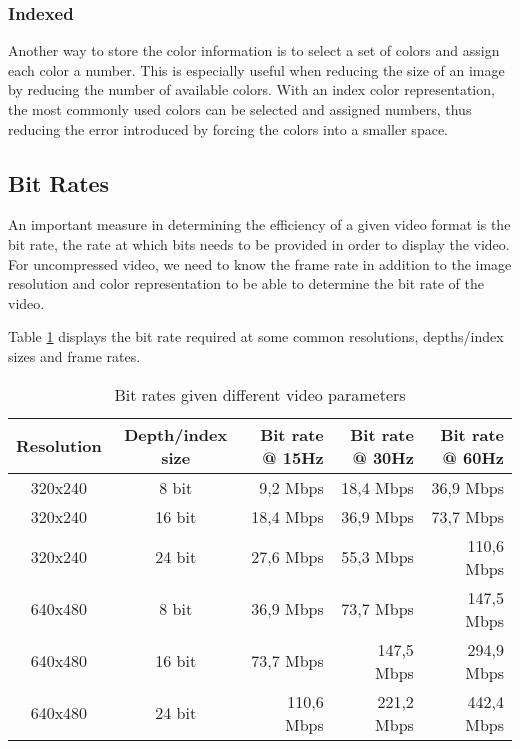 \subsubsection{Indexed}
Another way to store the color information is to select a set of colors and assign each color a number.
This is especially useful when reducing the size of an image by reducing the number of available colors.
With an index color representation, the most commonly used colors can be selected and assigned numbers, thus reducing the error introduced by forcing the colors into a smaller space.

\subsection{Bit Rates}
An important measure in determining the efficiency of a given video format is the bit rate, the rate at which bits needs to be provided in order to display the video.
For uncompressed video, we need to know the frame rate in addition to the image resolution and color representation to be able to determine the bit rate of the video.

Table \ref{tab:BitRates} displays the bit rate required at some common resolutions, depths/index sizes and frame rates.
\begin{table}[]
    \centering
    \begin{tabular}{ccrrr}
        Resolution & Depth/index size & Bit rate @ 15Hz & Bit rate @ 30Hz & Bit rate @ 60Hz \\
        \hline
        320x240 & 8 bit & 9,2 Mbps   & 18,4 Mbps  & 36,9 Mbps  \\
        320x240 & 16 bit & 18,4 Mbps  & 36,9 Mbps  & 73,7 Mbps  \\
        320x240 & 24 bit & 27,6 Mbps  & 55,3 Mbps  & 110,6 Mbps \\
        640x480 & 8 bit & 36,9 Mbps  & 73,7 Mbps  & 147,5 Mbps \\
        640x480 & 16 bit & 73,7 Mbps  & 147,5 Mbps & 294,9 Mbps \\
        640x480 & 24 bit & 110,6 Mbps & 221,2 Mbps & 442,4 Mbps
    \end{tabular}
    \caption{Bit rates given different video parameters}
    \label{tab:BitRates}
\end{table}
